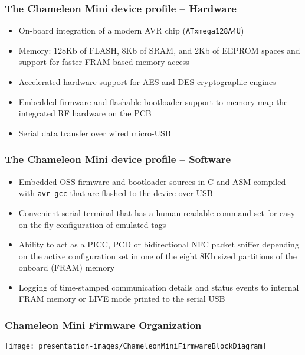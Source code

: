 \documentclass[usenames,svgnames,dvipsnames,11pt]{beamer}
\begin{document}
\begin{frame}
\frametitle{The Chameleon Mini device profile -- Hardware}

\begin{itemize} 

\item On-board integration of a modern AVR chip (\texttt{ATxmega128A4U}) 
\item Memory: 128Kb of FLASH, 8Kb of SRAM, and 2Kb of EEPROM spaces and 
      support for faster FRAM-based memory access
\item Accelerated hardware support for AES and DES cryptographic engines
\item Embedded firmware and flashable bootloader support to memory map the integrated RF hardware on the PCB
\item Serial data transfer over wired micro-USB 

\end{itemize} 

\end{frame}


\begin{frame}
\frametitle{The Chameleon Mini device profile -- Software}

\begin{itemize} 

\item Embedded OSS firmware and bootloader sources in C and ASM compiled with \texttt{avr-gcc} that are 
      flashed to the device over USB 
\item Convenient serial terminal that has a human-readable command set for easy on-the-fly configuration of 
      emulated tags 
\item Ability to act as a PICC, PCD or bidirectional NFC packet sniffer 
      depending on the active configuration set in one of the eight 
      8Kb sized partitions of the onboard (FRAM) memory 
\item Logging of time-stamped communication details and status events to internal FRAM memory or 
      LIVE mode printed to the serial USB 

\end{itemize} 

\end{frame}

\begin{frame}
\frametitle{Chameleon Mini Firmware Organization}

\begin{center}
\texttt{[image: presentation-images/ChameleonMiniFirmwareBlockDiagram]}
\end{center}

\end{frame}
\end{document}
